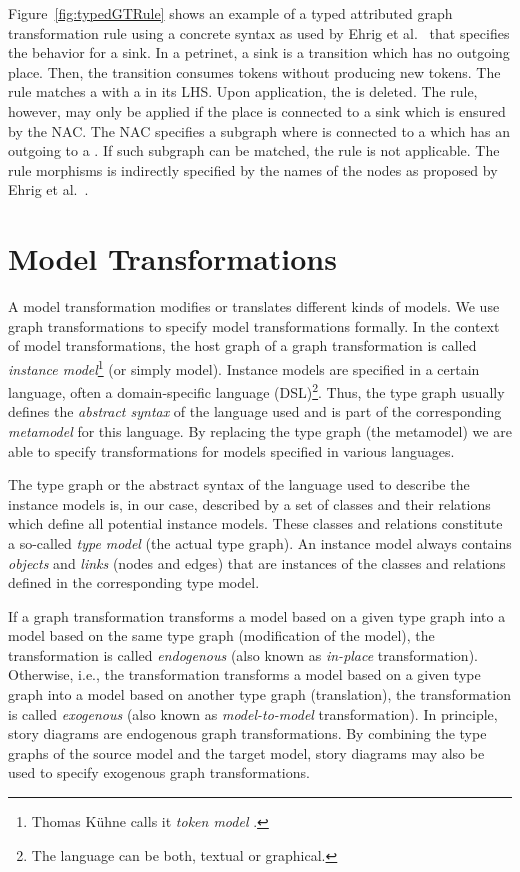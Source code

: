 Figure~\ref{fig:typedGTRule} shows an example of a typed attributed graph transformation rule using a concrete syntax as used by Ehrig et al.~\cite{EEPT06} that specifies the behavior for a sink.
In a petrinet, a sink is a transition which has no outgoing place.
Then, the transition consumes tokens without producing new tokens.
The rule matches a  with a  in its LHS.
Upon application, the  is deleted.
The rule, however, may only be applied if the place  is connected to a sink which is ensured by the NAC.
The NAC specifies a subgraph where  is connected to a  which has an outgoing  to a .
If such subgraph can be matched, the rule is not applicable.
The rule morphisms is indirectly specified by the names of the nodes as proposed by Ehrig et al.~\cite{EEPT06}.


\section{Model Transformations}
\label{sec:modelTransformation}

A model transformation modifies or translates different kinds of models.
We use graph transformations to specify model transformations formally.
In the context of model transformations, the host graph of a graph transformation is called \emph{instance model}\footnote{Thomas K\"{u}hne calls it \emph{token model} \cite{Kue06}.} (or simply model).
Instance models are specified in a certain language, often a domain-specific language (DSL)\footnote{The language can be both, textual or graphical.}.
Thus, the type graph usually defines the \emph{abstract syntax} of the language used and is part of the corresponding \emph{metamodel} \cite{Kue06} for this language.
By replacing the type graph (the metamodel) we are able to specify transformations for models specified in various languages.

The type graph or the abstract syntax of the language used to describe the instance models
is, in our case, described by a set of classes and their relations which define all potential instance models.
These classes and relations constitute a so-called \emph{type model} (the actual type graph).
An instance model always contains \emph{objects} and \emph{links} (nodes and edges) that are instances of the classes and relations defined in the corresponding type model.

If a graph transformation transforms a model based on a given type graph into a model based on the same type graph (modification of the model),
the transformation is called \emph{endogenous} (also known as \emph{in-place} transformation).
Otherwise, i.e., the transformation transforms a model based on a given type graph into a model based on another type graph (translation),
the transformation is called \emph{exogenous} (also known as \emph{model-to-model} transformation).
In principle, story diagrams are endogenous graph transformations.
By combining the type graphs of the source model and the target model, story diagrams may also be used to specify exogenous graph transformations.

